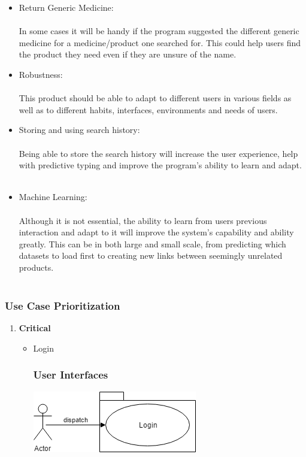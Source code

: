 \documentclass[a4paper,10pt]{article}
\begin{document}
{\begin{itemize}
		\item Return Generic Medicine:\\\\
			In some cases it will be handy if the program suggested the different generic medicine for a medicine/product one searched for. This could help users find the product they need even if they are unsure of the name.
	
		\item Robustness:\\\\
			This product should be able to adapt to different users in various fields as well as to different habits, interfaces, environments and needs of users.  
	
		\item Storing and using search history:\\\\
			Being able to store the search history will increase the user experience, help with predictive typing and improve the program's ability to learn and adapt.\\\\
	
		\item Machine Learning:\\\\
			Although it is not essential, the ability to learn from users previous interaction and adapt to it will improve the system’s capability and ability greatly. This can be in both large and small scale, from predicting which datasets to load first to creating new links between seemingly unrelated products.\\\\
		\end{itemize}

	
	\subsubsection{Use Case Prioritization} 
		\begin{enumerate} 
		\item \textbf{Critical} 
			\begin{itemize} 
				\item Login
                 \subsubsection{User Interfaces}
		 \includegraphics[scale=0.62]{login.png}


\end{itemize}
\end{enumerate}}
\end{document}
